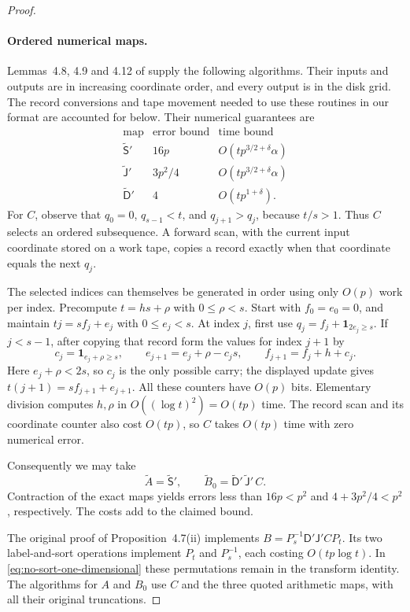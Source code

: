 \documentclass[11pt]{article}
\theoremstyle{definition}
\begin{document}
\begin{proof}
\paragraph{Ordered numerical maps.}
Lemmas~4.8, 4.9 and 4.12 of
\cite{HarveyHoeven2021} supply the following algorithms. Their inputs
and outputs are in increasing coordinate order, and every output is in
the disk grid. The record conversions and tape movement needed to use
these routines in our format are accounted for below. Their numerical
guarantees are
\[
\begin{array}{c|c|c}
 \text{map}&\text{error bound}&\text{time bound}\\ \hline
 \widetilde{\mathsf S}'&16p&O(tp^{3/2+\delta}\alpha)\\
 \widetilde{\mathsf J}'&3p^2/4&O(tp^{3/2+\delta}\alpha)\\
 \widetilde{\mathsf D}'&4&O(tp^{1+\delta}).
\end{array}
\]
For $C$, observe that $q_0=0$, $q_{s-1}<t$, and $q_{j+1}>q_j$,
because $t/s>1$. Thus $C$ selects an ordered subsequence. A forward scan,
with the current input coordinate stored on a work tape, copies a record
exactly when that coordinate equals the next $q_j$.

The selected indices can themselves be generated in order using only
$O(p)$ work per index. Precompute $t=hs+\rho$ with $0\leq\rho<s$.
Start with $f_0=e_0=0$, and maintain
$tj=sf_j+e_j$ with $0\leq e_j<s$. At index $j$, first use
$q_j=f_j+\mathbf1_{2e_j\geq s}$. If $j<s-1$, after copying that record
form the values for index $j+1$ by
\[
 c_j=\mathbf1_{e_j+\rho\geq s},\qquad
 e_{j+1}=e_j+\rho-c_js,\qquad
 f_{j+1}=f_j+h+c_j.
\]
Here $e_j+\rho<2s$, so $c_j$ is the only possible carry; the displayed
update gives $t(j+1)=sf_{j+1}+e_{j+1}$. All these counters have $O(p)$
bits. Elementary division computes $h,\rho$ in
$O((\log t)^2)=O(tp)$ time. The record scan and its coordinate counter
also cost $O(tp)$, so $C$ takes $O(tp)$ time with zero numerical error.

Consequently we may take
\[
 \widetilde A=\widetilde{\mathsf S}',
 \qquad
 \widetilde B_0=\widetilde{\mathsf D}'\,
                    \widetilde{\mathsf J}'\,C.
\]
Contraction of the exact maps yields errors less than $16p<p^2$ and
$4+3p^2/4<p^2$, respectively. The costs add to the claimed bound.

The original proof of Proposition~4.7(ii) implements
$B=P_s^{-1}\mathsf D'\mathsf J'CP_t$. Its two label-and-sort operations
implement $P_t$ and $P_s^{-1}$, each costing $O(tp\log t)$.
In \eqref{eq:no-sort-one-dimensional} these permutations remain in the
transform identity. The algorithms for $A$ and $B_0$ use $C$ and the
three quoted arithmetic maps, with all their original truncations.


\end{proof}
\end{document}
